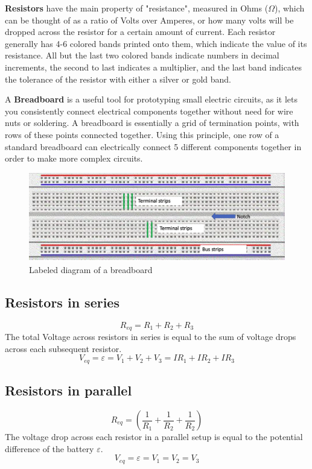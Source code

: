 \documentclass[titlepage]{article}
\begin{document}
    \textbf{Resistors} have the main property of "resistance", measured in Ohms ($\Omega$), which can be thought of as a ratio of Volts over Amperes, or how many volts will be dropped across the resistor for a certain amount of current. Each resistor generally has 4-6 colored bands printed onto them, which indicate the value of its resistance. All but the last two colored bands indicate numbers in decimal increments, the second to last indicates a multiplier, and the last band indicates the tolerance of the resistor with either a silver or gold band. \\ 
    \vspace{5pt}

    A \textbf{Breadboard} is a useful tool for prototyping small electric circuits, as it lets you consistently connect electrical components together without need for wire nuts or soldering. A breadboard is essentially a grid of termination points, with rows of these points connected together. Using this principle, one row of a standard breadboard can electrically connect 5 different components together in order to make more complex circuits.

    \begin{figure}[hbt!]
        \centering
        \caption{Labeled diagram of a breadboard}
        \includegraphics[scale = 0.2]{theory/breadboard}
    \end{figure} 


    \subsection*{Resistors in series}
        $$R_{eq} = R_1 +R_2 + R_3 $$
        The total Voltage across resistors in series is equal to the sum of voltage drops across each subsequent resistor. $$ V_{eq} = \varepsilon = V_1 + V_2 + V_3 = I R_1 + I R_2 + I R_3 $$

    \subsection*{Resistors in parallel} 
        $$R_{eq} = \left( \frac{1}{R_1} + \frac{1}{R_2} + \frac{1}{R_2} \right)  $$
        The voltage drop across each resistor in a parallel setup is equal to the potential difference of the battery $\varepsilon$.
        $$V_{eq} = \varepsilon = V_1 = V_2 = V_3 $$
\end{document}
